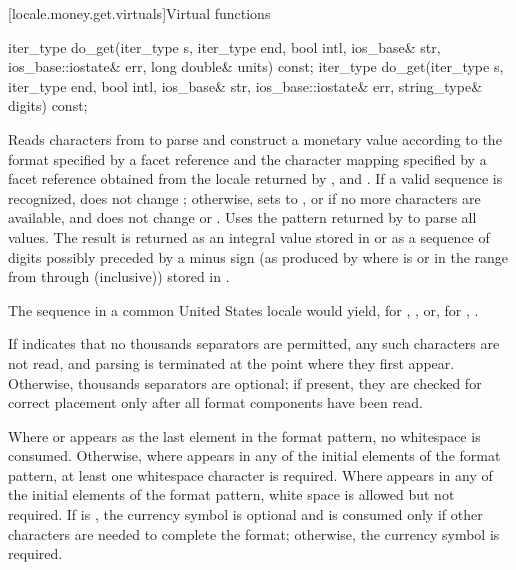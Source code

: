 [locale.money.get.virtuals]{Virtual functions}

%
\begin{itemdecl}
iter_type do_get(iter_type s, iter_type end, bool intl, ios_base& str,
                 ios_base::iostate& err, long double& units) const;
iter_type do_get(iter_type s, iter_type end, bool intl, ios_base& str,
                 ios_base::iostate& err, string_type& digits) const;
\end{itemdecl}

\begin{itemdescr}
\pnum
\effects
Reads characters from  to parse and construct a monetary value
according to the format specified by
a  facet reference 
and the character mapping specified by
a  facet reference 
obtained from the locale returned by , and
.
If a valid sequence is recognized, does not change ;
otherwise, sets  to , or
 if no more characters are available,
and does not change  or .
Uses the pattern returned by  to parse all values.
The result is returned as an integral value stored in 
or as a sequence of digits possibly preceded by a minus sign
(as produced by 
where  is  or
in the range from  through  (inclusive))
stored in .
\begin{example}
The sequence  in a common United States locale would yield,
for , , or,
for , .
\end{example}
If  indicates that no thousands separators are permitted,
any such characters are not read, and
parsing is terminated at the point where they first appear.
Otherwise, thousands separators are optional;
if present, they are checked for correct placement only after
all format components have been read.

\pnum
Where  or 
appears as the last element in the format pattern,
no whitespace is consumed.
Otherwise, where  appears in any of
the initial elements of the format pattern,
at least one whitespace character is required.
Where  appears
in any of the initial elements of the format pattern,
white space is allowed but not required.
If  is ,
the currency symbol is optional and
is consumed only if other characters are needed to complete the format;
otherwise, the currency symbol is required.


\end{itemdescr}
